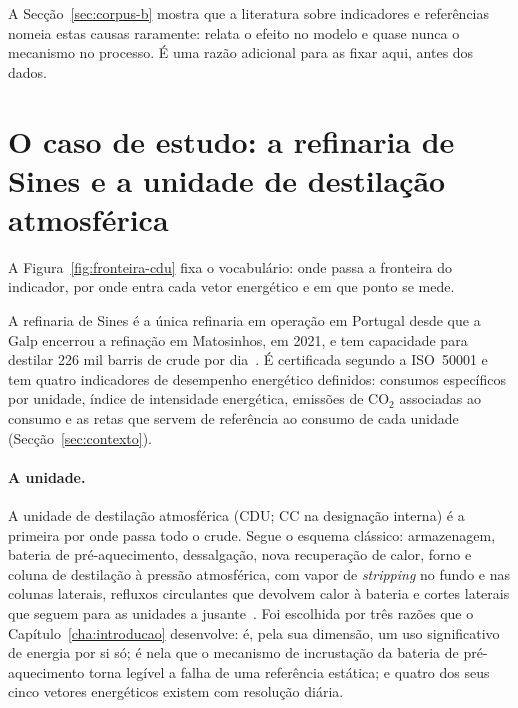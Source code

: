 A Secção~\ref{sec:corpus-b} mostra que a literatura sobre indicadores e
referências nomeia estas causas raramente: relata o efeito no modelo e
quase nunca o mecanismo no processo. É uma razão adicional para as fixar
aqui, antes dos dados.

\section{O caso de estudo: a refinaria de Sines e a unidade de destilação atmosférica}
\label{sec:caso-estudo}
A Figura~\ref{fig:fronteira-cdu} fixa o vocabulário: onde passa a fronteira do indicador, por onde entra cada vetor energético e em que ponto se mede.



A refinaria de Sines é a única refinaria em operação em Portugal desde que a
Galp encerrou a refinação em Matosinhos, em 2021, e tem capacidade para
destilar 226 mil barris de crude por dia~\cite{Galp2026Industrial}. É certificada
segundo a ISO~50001 e tem quatro indicadores de desempenho energético
definidos: consumos específicos por unidade, índice de intensidade
energética, emissões de CO$_2$ associadas ao consumo e as retas que servem
de referência ao consumo de cada unidade (Secção~\ref{sec:contexto}).

\paragraph{A unidade.} A unidade de destilação atmosférica (CDU; CC na
designação interna) é a primeira por onde passa todo o crude. Segue o
esquema clássico: armazenagem, bateria de pré-aquecimento, dessalgação,
nova recuperação de calor, forno e coluna de destilação à pressão
atmosférica, com vapor de \emph{stripping} no fundo e nas colunas laterais,
refluxos circulantes que devolvem calor à bateria e cortes laterais que
seguem para as unidades a jusante~\cite{Gary2007}. Foi escolhida por três
razões que o Capítulo~\ref{cha:introducao} desenvolve: é, pela sua dimensão,
um uso significativo de energia por si só; é nela que o mecanismo de
incrustação da bateria de pré-aquecimento torna legível a falha de uma
referência estática; e quatro dos seus cinco vetores energéticos existem
com resolução diária.

